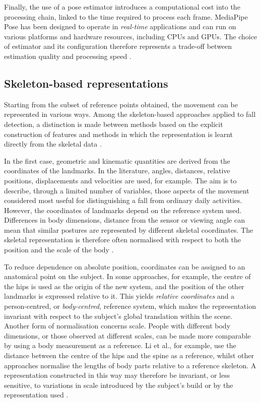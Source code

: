 Finally, the use of a pose estimator introduces a computational cost into the processing chain, linked to the time required to process each frame. MediaPipe Pose has been designed to operate in \emph{real-time} applications and can run on various platforms and hardware resources, including CPUs and GPUs. The choice of estimator and its configuration therefore represents a trade-off between estimation quality and processing speed \cite{BL,MP}.

\subsection{Skeleton-based representations}

Starting from the subset of reference points obtained, the movement can be represented in various ways. Among the skeleton-based approaches applied to fall detection, a distinction is made between methods based on the explicit construction of features and methods in which the representation is learnt directly from the skeletal data \cite{HO}.

In the first case, geometric and kinematic quantities are derived from the coordinates of the landmarks. In the literature, angles, distances, relative positions, displacements and velocities are used, for example. The aim is to describe, through a limited number of variables, those aspects of the movement considered most useful for distinguishing a fall from ordinary daily activities.\\
However, the coordinates of landmarks depend on the reference system used. Differences in body dimensions, distance from the sensor or viewing angle can mean that similar postures are represented by different skeletal coordinates. The skeletal representation is therefore often normalised with respect to both the position and the scale of the body \cite{RA}.

To reduce dependence on absolute position, coordinates can be assigned to an anatomical point on the subject. In some approaches, for example, the centre of the hips is used as the origin of the new system, and the position of the other landmarks is expressed relative to it. This yields \emph{relative coordinates} and a person-centred, or \emph{body-centred}, reference system, which makes the representation invariant with respect to the subject's global translation within the scene.
Another form of normalisation concerns scale. People with different body dimensions, or those observed at different scales, can be made more comparable by using a body measurement as a reference. Li et al., for example, use the distance between the centre of the hips and the spine as a reference, whilst other approaches normalise the lengths of body parts relative to a reference skeleton. A representation constructed in this way may therefore be invariant, or less sensitive, to variations in scale introduced by the subject's build or by the representation used \cite{RL,RA}.

